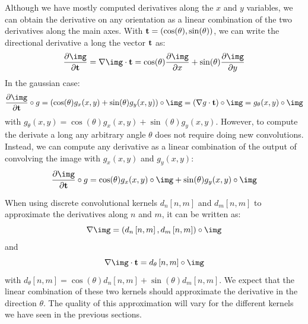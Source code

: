 Although we have mostly computed derivatives along the $x$ and $y$ variables, we can obtain the derivative on any orientation as a linear combination of the two derivatives along the main axes. With ${\bf t}=\left( \cos (\theta), \sin(\theta) \right)$, we can write the directional derivative a long the vector ${\bf t}$ as:
\begin{equation}
	\frac{\partial \img}{\partial {\bf t}} =  \nabla \img \cdot {\bf t} = \cos(\theta) \frac{\partial \img}{\partial x} + \sin(\theta) \frac{\partial \img}{\partial y}
\end{equation}
In the gaussian case:
\begin{equation}
	\frac{\partial \img}{\partial {\bf t}} \circ g = \left( \cos(\theta) g_x(x,y) + \sin(\theta) g_y(x,y) \right) \circ \img = \left( \nabla g  \cdot {\bf t} \right) \circ \img
	= g_{\theta} (x,y)  \circ \img
\end{equation}
with $g_{\theta} (x,y) = \cos(\theta) g_x(x,y) + \sin(\theta) g_y(x,y)$. However, to compute the derivate a long any arbitrary angle $\theta$ does not require doing new convolutions. Instead, we can compute any derivative as a linear combination of the output of convolving the image with $g_x(x,y)$ and $g_y(x,y)$:
\begin{equation}
	\frac{\partial \img}{\partial {\bf t}} \circ g =  \cos(\theta) g_x(x,y) \circ \img + \sin(\theta) g_y(x,y) \circ \img
\end{equation}

When using discrete convolutional kernels $d_n\left[n,m\right]$ and $d_m\left[n,m\right]$ to approximate the derivatives along $n$ and $m$, it can be written as:
\begin{equation}
	\nabla \img = \left( d_n\left[n,m\right], d_m\left[n,m\right] \right) \circ \img
\end{equation}
and
\begin{equation}
	\nabla \img \cdot {\bf t} =d_{\theta} \left[n,m\right] \circ \img
\end{equation}
with $d_{\theta} \left[n,m\right]  = \cos(\theta) d_n\left[n,m\right] + \sin(\theta) d_m\left[n,m\right]$. We expect that the linear combination of these two kernels should approximate the derivative in the direction $\theta$. The quality of this approximation will vary for the different kernels we have seen in the previous sections.


